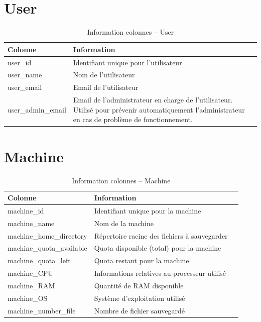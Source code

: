 \documentclass[a4paper,10pt, twoside]{report}
\begin{document}
\begin{spacing}{1.2}
\section{User}
\begin{table}[h!]
  \centering
  \def\arraystretch{1.5}
  \setlength{\fboxsep}{13pt} %
  \setlength{\fboxrule}{0pt} %
  \begin{tabular}{lm{6cm}m{6cm}}
   \rowcolor{arkred} 
    \arrayrulecolor{gray73}\hline
    \color{white} \textbf{Colonne} & \color{white} \textbf{Information}\\
    \hline
    user\_id & Identifiant unique pour l'utilisateur\\
    \hline
    user\_name & Nom de l'utilisateur\\
    \hline
    user\_email & Email de l'utilisateur\\
    \hline
    user\_admin\_email & Email de l'administrateur en charge de l'utilisateur.
    Utilis\'e pour pr\'evenir automatiquement l'administrateur en cas de
    probl\`eme de fonctionnement.
  \end{tabular}
  \caption{\label{tabDBRUser} Information colonnes -- User}
\end{table}

\section{Machine}
\begin{table}[h!]
  \centering
  \def\arraystretch{1.5}
  \setlength{\fboxsep}{13pt} %
  \setlength{\fboxrule}{0pt} %
  \begin{tabular}{lm{6cm}m{6cm}}
   \rowcolor{arkred} 
    \arrayrulecolor{gray73}\hline
    \color{white} \textbf{Colonne} & \color{white} \textbf{Information}\\
    \hline
    machine\_id & Identifiant unique pour la machine\\
    \hline
    machine\_name & Nom de la machine\\
    \hline
    machine\_home\_directory & R\'epertoire racine des fichiers \`a sauvegarder\\
    \hline
    machine\_quota\_available & Quota disponible (total) pour la machine\\
    \hline
    machine\_quota\_left & Quota restant pour la machine\\
    \hline
    machine\_CPU & Informations relatives au processeur utilis\'e\\
    \hline
    machine\_RAM & Quantit\'e de RAM disponible\\
    \hline
    machine\_OS & Syst\`eme d'exploitation utilis\'e\\
    \hline
    machine\_number\_file & Nombre de fichier sauvegard\'e
  \end{tabular}
  \caption{\label{tabDBRMachine} Information colonnes -- Machine}
\end{table}


\end{spacing}
\end{document}

